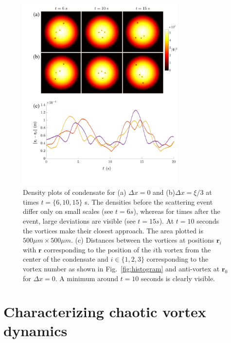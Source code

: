 \begin{figure}
\center \includegraphics[width=0.75\textwidth]{data/2d/snapshots/snapshots}

\caption{
Density plots of condensate for (a) $\Delta x = 0$ and (b)$\Delta x=\xi/3$ at times $t=\{6,10,15\}$ s. The densities before the scattering event differ only on small scales (see $t=6s$), whereas for times after the event, large deviations are visible (see $t=15s$).
At $t=10$ seconds the vortices make their closest approach. The area plotted is $500 \mu m\times 500 \mu m$.
(c) Distances between the vortices at positions $\mathbf{r}_i$ with $\mathbf{r}$ corresponding to the position of the $i$th vortex from the center of the condensate and $i\in \{1,2,3\}$ corresponding to the vortex number as shown in Fig.~\ref{fig:histogram} and anti-vortex at $\mathbf{r}_0$ for $\Delta x = 0$.
A minimum around $t=10$ seconds is clearly visible.
}
\label{fig:snapshots}
\end{figure}

\section{Characterizing chaotic vortex dynamics}

